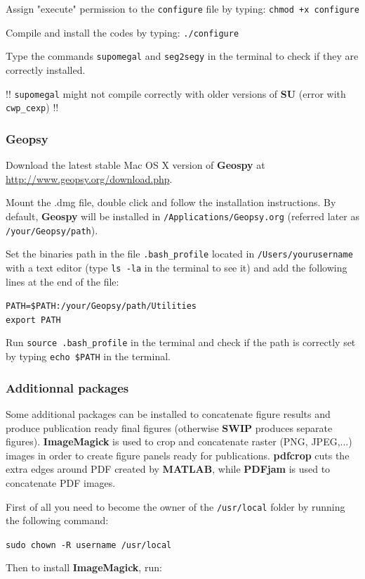 \documentclass[twoside,a4paper]{article}
\def\SWIP{\textbf{SWIP}}
\def\SU{\textbf{SU}}
\def\Geopsy{\textbf{Geospy}}
\def\ImageMagick{\textbf{ImageMagick}}
\def\PDFjam{\textbf{PDFjam}}
\def\pdfcrop{\textbf{pdfcrop}}
\def\MATLAB{\textbf{MATLAB}}
\begin{document}
Assign "execute" permission to the \verb|configure| file by typing: \verb|chmod +x configure|

Compile and install the codes by typing: \verb|./configure|

Type the commands \verb|supomegal| and \verb|seg2segy| in the terminal to check if they are correctly installed.

!! \verb|supomegal| might not compile correctly with older versions of {\SU} (error with \verb|cwp_cexp|) !!

\subsubsection{Geopsy}
Download the latest stable Mac OS X version of {\Geopsy} at \url{http://www.geopsy.org/download.php}.

Mount the .dmg file, double click and follow the installation instructions. By default, {\Geopsy} will be installed in \verb|/Applications/Geopsy.org| (referred later as \verb|/your/Geopsy/path|).

Set the binaries path in the file \verb|.bash_profile| located in \verb|/Users/yourusername| with a text editor (type \verb|ls -la| in the terminal to see it) and add the following lines at the end of the file:

\verb|PATH=$PATH:/your/Geopsy/path/Utilities|\\
\verb|export PATH|

Run \verb|source .bash_profile| in the terminal and check if the path is correctly set by typing \verb|echo $PATH| in the terminal.

\subsubsection{Additionnal packages}
Some additional packages can be installed to concatenate figure results and produce publication ready final figures (otherwise {\SWIP} produces separate figures). {\ImageMagick} is used to crop and concatenate raster (PNG, JPEG,...) images in order to create figure panels ready for publications. {\pdfcrop} cuts the extra edges around PDF created by {\MATLAB}, while {\PDFjam} is used to concatenate PDF images.

First of all you need to become the owner of the \verb|/usr/local| folder by running the following command:

\verb|sudo chown -R username /usr/local|

Then to install {\ImageMagick}, run:
\end{document}
